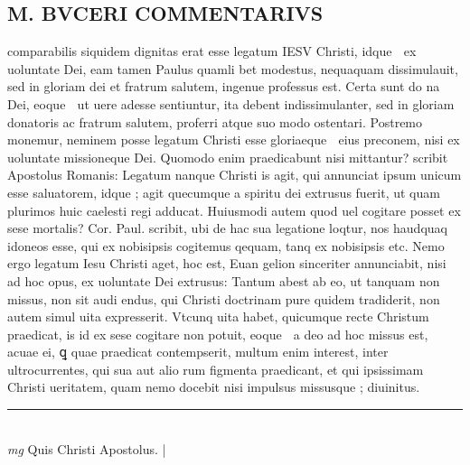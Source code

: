 \documentclass{article}
\begin{document}
\begin{pages}
\section*{M. BVCERI COMMENTARIVS }
\marginpar{[ p.18 ]}\pstart comparabilis siquidem dignitas erat esse legatum IESV Christi, idque  ex uoluntate Dei, eam tamen Paulus quamli bet modestus, nequaquam dissimulauit, sed in gloriam dei et fratrum salutem, ingenue professus est. Certa sunt do na Dei, eoque  ut uere adesse sentiuntur, ita debent indissimulanter, sed in gloriam donatoris ac fratrum salutem, proferri atque suo modo ostentari.  Postremo monemur, neminem posse legatum Christi esse gloriaeque  eius preconem, nisi ex uoluntate missioneque Dei.  Quomodo enim praedicabunt nisi mittantur? scribit Apostolus Romanis: Legatum nanque  Christi is agit, qui annunciat ipsum unicum esse saluatorem, idque ; agit quecumque  a spiritu dei extrusus fuerit, ut quam plurimos huic caelesti regi adducat.  Huiusmodi autem quod uel cogitare posset ex sese mortalis? Cor. Paul.  scribit, ubi de hac sua legatione loqtur, nos haudquaq idoneos esse, qui ex nobisipsis cogitemus qequam, tanq ex nobisipsis etc.  Nemo ergo legatum Iesu Christi aget, hoc est, Euan gelion sinceriter annunciabit, nisi ad hoc opus, ex uoluntate Dei extrusus:  \pend\pstart Tantum abest ab eo, ut tanquam non missus, non sit audi endus, qui Christi doctrinam pure quidem tradiderit, non autem simul uita expresserit. Vtcunq uita habet, quicumque recte Christum praedicat, is id ex sese cogitare non potuit, eoque  a deo ad hoc missus est, acuae ei, ꝗ quae praedicat contempserit, multum enim interest, inter ultrocurrentes, qui sua aut alio rum figmenta praedicant, et qui ipsissimam Christi ueritatem, quam nemo docebit nisi impulsus missusque ; diuinitus.   \pend
\vspace{0.5cm}\noindent
\vspace{0.2cm}\rule{1cm}{0.2pt}\\ 
\hspace{0.2cm}\textit{mg}
\footnotesize Quis Christi Apostolus.  
\normalsize| 

\end{pages}
\end{document}
